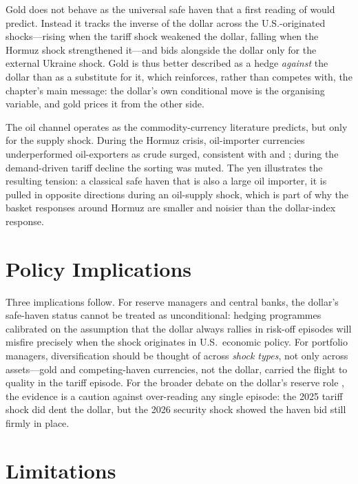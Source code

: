 Gold does not behave as the universal safe haven that a first reading of
\textcite{baur2010} would predict. Instead it tracks the inverse of the dollar across the
U.S.-originated shocks---rising when the tariff shock weakened the dollar, falling when the
Hormuz shock strengthened it---and bids alongside the dollar only for the external Ukraine
shock. Gold is thus better described as a hedge \emph{against} the dollar than as a
substitute for it, which reinforces, rather than competes with, the chapter's main message:
the dollar's own conditional move is the organising variable, and gold prices it from the
other side.

The oil channel operates as the commodity-currency literature predicts, but only for the
supply shock. During the Hormuz crisis, oil-importer currencies underperformed
oil-exporters as crude surged, consistent with \textcite{chen2003} and \textcite{kilian2009};
during the demand-driven tariff decline the sorting was muted. The yen illustrates the
resulting tension: a classical safe haven that is also a large oil importer, it is pulled in
opposite directions during an oil-supply shock, which is part of why the basket responses
around Hormuz are smaller and noisier than the dollar-index response.

\section{Policy Implications}
\label{sec:disc_policy}

Three implications follow. For reserve managers and central banks, the dollar's safe-haven
status cannot be treated as unconditional: hedging programmes calibrated on the assumption
that the dollar always rallies in risk-off episodes will misfire precisely when the shock
originates in U.S.\ economic policy. For portfolio managers, diversification should be
thought of across \emph{shock types}, not only across assets---gold and competing-haven
currencies, not the dollar, carried the flight to quality in the tariff episode. For the
broader debate on the dollar's reserve role \parencite{obstfeld2023,jiang2026}, the evidence
is a caution against over-reading any single episode: the 2025 tariff shock did dent the
dollar, but the 2026 security shock showed the haven bid still firmly in place.

\section{Limitations}
\label{sec:disc_limitations}

